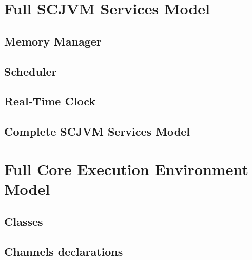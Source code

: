 \documentclass[a4paper,11pt]{report}
\newif\ifFullModel
\begin{document}








{\raggedright \printbibliography}

\appendix

\chapter{Full SCJVM Services Model}
\label{full-scjvm-services-model}
\FullModeltrue

\section{Memory Manager}


\section{Scheduler}


\section{Real-Time Clock}


\section{Complete SCJVM Services Model}


\chapter{Full Core Execution Environment Model}
\label{full-cee-model}

\section{Classes}


\section{Channels declarations}
\label{cee-model-channels}


\end{document}
